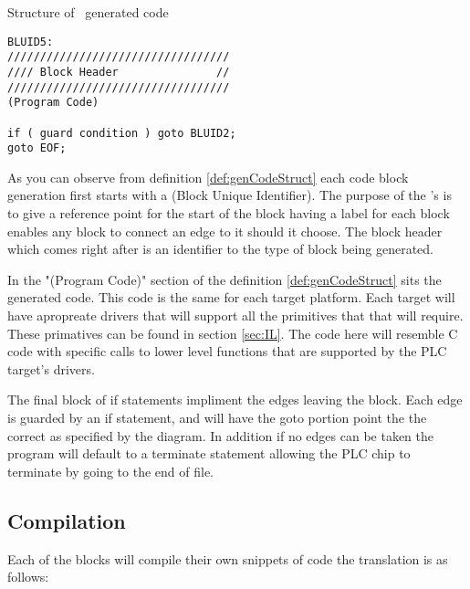 \begin{definition}
\label{def:genCodeStruct}
Structure of \plcchart \  generated code

\begin{lstlisting}
BLUID5:
//////////////////////////////////
//// Block Header               //
//////////////////////////////////
(Program Code)

if ( guard condition ) goto BLUID2;
goto EOF;
\end{lstlisting}
\end{definition}

As you can observe from definition \ref{def:genCodeStruct} each code block generation first starts with a  (Block Unique Identifier). The purpose of the 's is to give a reference point for the start of the block having a  label for each block enables any block to connect an edge to it should it choose. The block header which comes right after is an identifier to the type of block being generated. 

In the "(Program Code)" section of the definition \ref{def:genCodeStruct} sits the generated  code. This code is the same for each target platform. Each  target will have apropreate drivers that will support all the primitives that that  will require. These primatives can be found in section \ref{sec:IL}. The code here will resemble C code with specific calls to lower level functions that are supported by the PLC target's drivers.

The final block of if statements impliment the edges leaving the block. Each edge is guarded by an if statement, and will have the goto portion point the the correct  as specified by the diagram. In addition if no edges can be taken the program will default to a terminate statement allowing the PLC chip to terminate by going to the end of file.

\subsection{Compilation}
Each of the blocks will compile their own snippets of code the translation is as follows:

